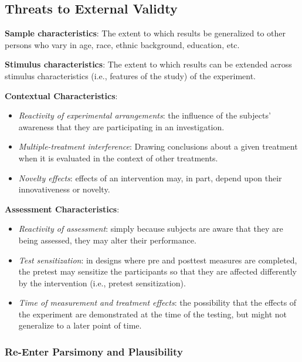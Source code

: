 \documentclass[
  english,
]{book}
\providecommand{\tightlist}{%
  \setlength{\itemsep}{0pt}\setlength{\parskip}{0pt}}
\begin{document}
\hypertarget{threats-to-external-validty}{%
\subsection{Threats to External Validty}\label{threats-to-external-validty}}

\textbf{Sample characteristics}: The extent to which results be generalized to other persons who vary in age, race, ethnic background, education, etc.

\textbf{Stimulus characteristics}: The extent to which results can be extended across stimulus characteristics (i.e., features of the study) of the experiment.

\textbf{Contextual Characteristics}:

\begin{itemize}
\tightlist
\item
  \emph{Reactivity of experimental arrangements}: the influence of the subjects' awareness that they are participating in an investigation.
\item
  \emph{Multiple-treatment interference}: Drawing conclusions about a given treatment when it is evaluated in the context of other treatments.
\item
  \emph{Novelty effects}: effects of an intervention may, in part, depend upon their innovativeness or novelty.
\end{itemize}

\textbf{Assessment Characteristics}:

\begin{itemize}
\tightlist
\item
  \emph{Reactivity of assessment}: simply because subjects are aware that they are being assessed, they may alter their performance.
\item
  \emph{Test sensitization}: in designs where pre and posttest measures are completed, the pretest may sensitize the participants so that they are affected differently by the intervention (i.e., pretest sensitization).
\item
  \emph{Time of measurement and treatment effects}: the possibility that the effects of the experiment are demonstrated at the time of the testing, but might not generalize to a later point of time.
\end{itemize}

\hypertarget{re-enter-parsimony-and-plausibility}{%
\subsubsection{Re-Enter Parsimony and Plausibility}\label{re-enter-parsimony-and-plausibility}}
\end{document}

